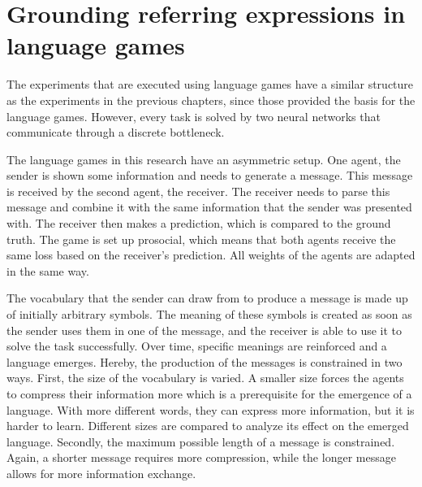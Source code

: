 \section{Grounding referring expressions in language games}
\label{sec:language-games}
The experiments that are executed using language games have a similar structure as the experiments in the previous chapters, since those provided the basis for the language games.
However, every task is solved by two neural networks that communicate through a discrete bottleneck.

The language games in this research have an asymmetric setup.
One agent, the sender is shown some information and needs to generate a message.
This message is received by the second agent, the receiver.
The receiver needs to parse this message and combine it with the same information that the sender was presented with.
The receiver then makes a prediction, which is compared to the ground truth.
The game is set up prosocial, which means that both agents receive the same loss based on the receiver's prediction.
All weights of the agents are adapted in the same way.

The vocabulary that the sender can draw from to produce a message is made up of initially arbitrary symbols.
The meaning of these symbols is created as soon as the sender uses them in one of the message, and the receiver is able to use it to solve the task successfully.
Over time, specific meanings are reinforced and a language emerges.
Hereby, the production of the messages is constrained in two ways.
First, the size of the vocabulary is varied.
A smaller size forces the agents to compress their information more which is a prerequisite for the emergence of a language.
With more different words, they can express more information, but it is harder to learn.
Different sizes are compared to analyze its effect on the emerged language.
Secondly, the maximum possible length of a message is constrained.
Again, a shorter message requires more compression, while the longer message allows for more information exchange.

